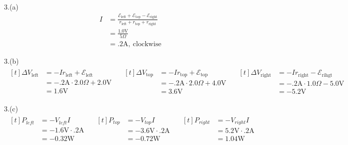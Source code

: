 \documentclass[11pt]{article}
\begin{document}
3.(a)
\begin{align*}
I &= \frac{\mathcal{E}_{\mathrm{left}} + \mathcal{E}_{\mathrm{top}} - \mathcal{E}_{\mathrm{right}}}{r_{\mathrm{left}} + r_{\mathrm{top}} + r_{\mathrm{right}}} \\
  &= \frac{1.0 \mathrm{V}}{5 \Omega} \\
  &= .2 \mathrm{A, \ clockwise}
\end{align*}

3.(b)
\begin{align*}
\begin{aligned}[t]
\Delta V_{\mathrm{left}} &= - Ir_{\mathrm{left}} + \mathcal{E}_{\mathrm{left}} \\
  &= - .2 \mathrm{A} \cdot 2.0 \Omega + 2.0 \mathrm{V} \\
  &= 1.6 \mathrm{V}
\end{aligned}
\quad
\begin{aligned}[t]
\Delta V_{\mathrm{top}} &= - Ir_{\mathrm{top}} + \mathcal{E}_{\mathrm{top}} \\
  &= - .2 \mathrm{A} \cdot 2.0 \Omega + 4.0 \mathrm{V} \\
  &= 3.6 \mathrm{V}
\end{aligned}
\quad
\begin{aligned}[t]
\Delta V_{\mathrm{right}} &= - Ir_{\mathrm{right}} - \mathcal{E}_{\mathrm{rihgt}} \\
  &= - .2 \mathrm{A} \cdot 1.0 \Omega - 5.0 \mathrm{V} \\
  &= -5.2 \mathrm{V}
\end{aligned}
\end{align*}

3.(c)
\begin{align*}
\begin{aligned}[t]
P_{left} &= - V_{left} I \\
  &= - 1.6 \mathrm{V} \cdot .2 \mathrm{A} \\
  &= - 0.32 \mathrm{W}
\end{aligned}
\quad
\begin{aligned}[t]
P_{top} &= - V_{top} I \\
  &= - 3.6 \mathrm{V} \cdot .2 \mathrm{A} \\
  &= - 0.72 \mathrm{W}
\end{aligned}
\quad
\begin{aligned}[t]
P_{right} &= - V_{right} I \\
  &=  5.2 \mathrm{V} \cdot .2 \mathrm{A} \\
  &=  1.04 \mathrm{W}
\end{aligned}
\quad
\end{align*}
\end{document}

